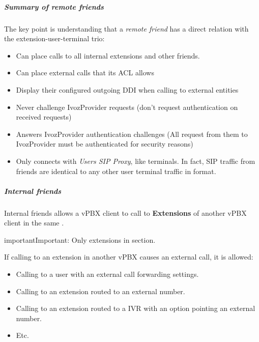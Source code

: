 \documentclass[letterpaper,10pt,english]{sphinxmanual}
\begin{document}
\subparagraph{Summary of remote friends}
\label{administration_portal/client/vpbx/routing_endpoints/friends/remote_friends:summary-of-remote-friends}
The key point is understanding that a \emph{remote friend} has a direct relation with the
extension-user-terminal trio:
\begin{itemize}
\item {} 
Can place calls to all internal extensions and other friends.

\item {} 
Can place external calls that its ACL allows

\item {} 
Display their configured outgoing DDI when calling to external entities

\item {} 
Never challenge IvozProvider requests (don't request authentication on received requests)

\item {} 
Answers IvozProvider authentication challenges (All request from them to
IvozProvider must be authenticated for security reasons)

\item {} 
Only connects with \emph{Users SIP Proxy}, like terminals. In fact, SIP traffic from
friends are identical to any other user terminal traffic in format.

\end{itemize}


\subparagraph{Internal friends}
\label{administration_portal/client/vpbx/routing_endpoints/friends/internal_friends:id1}\label{administration_portal/client/vpbx/routing_endpoints/friends/internal_friends::doc}\label{administration_portal/client/vpbx/routing_endpoints/friends/internal_friends:internal-friends}
Internal friends allows a vPBX client to call to \textbf{Extensions} of another vPBX client in the same {\hyperref[administration_portal/brand/settings/corporations:corporations]{}}.

\begin{notice}{important}{Important:}
Only extensions in {\hyperref[administration_portal/client/vpbx/extensions:extensions]{}} section.
\end{notice}

If calling to an extension in another vPBX causes an external call, it is allowed:
\begin{itemize}
\item {} 
Calling to a user with an external call forwarding settings.

\item {} 
Calling to an extension routed to an external number.

\item {} 
Calling to an extension routed to a IVR with an option pointing an external number.

\item {} 
Etc.

\end{itemize}
\end{document}
